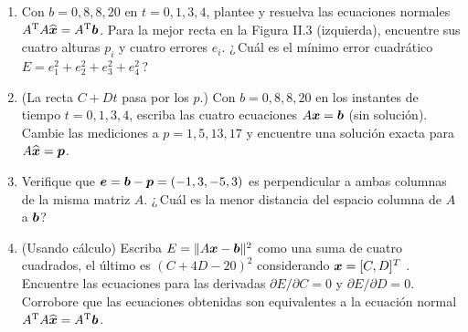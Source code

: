 \documentclass[12pt,a4paper]{article}
\newcommand\bwxhat{\widehat{\bi x}}
\newcommand{\bi}[1]{\hbox{\boldmath$#1$}}
\newcommand\1{\mbox{\,\vrule height-0.8pt depth1.0pt width2pc\,}}
\newcommand\2{\mbox{\,\vrule height-0.8pt depth1.0pt width1pc\,}}
\DeclareRobustCommand\transp{^{\mathrm{T}}}
\newcommand{\pa}{\partial}
\begin{document}
\begin{enumerate}
\item Con $b=0,8,8,20$ en $t=0,1,3,4$, plantee y resuelva las ecuaciones normales $A\transp A\bwxhat=A\transp \bi b$.  Para la mejor recta en la Figura II.3 (izquierda), encuentre sus cuatro alturas $p_i$ y cuatro errores $e_i$. ¿\,Cuál es el mínimo error cuadr\'atico $E=e^2_1+ e^2_2+e^2_3+e^2_4$\,?

\newpage
\item (La recta $C+Dt$ pasa por los $p$.) Con $b=0,8,8,20$ en los instantes de tiempo $t=0,1,3,4$, escriba las cuatro ecuaciones $A\bi x=\bi b$  (sin solución). Cambie las mediciones a $p=1,5,13,17$ y encuentre una solución exacta para $A\bwxhat= \bi p$.

\item Verifique que $\bi e=\bi b-\bi p=(-1,3,-5,3)$ es perpendicular a ambas columnas de la misma matriz $A$.  ¿\,Cuál es la menor distancia del espacio columna de $A$ a $\bi b$?

\item (Usando cálculo) Escriba $E=\|A\bi x-\bi b\|^2$ como una suma de cuatro cuadrados, el último es $(C + 4D -20)^2$ considerando $\bi x = [C, D]^T$ . Encuentre las ecuaciones para las derivadas $\pa E/\pa C=0$ y $\pa E/\pa D=0$. Corrobore que las ecuaciones obtenidas son equivalentes a la ecuación normal $A\transp  A\bwxhat=A\transp \bi b$.


\end{enumerate}
\end{document}
